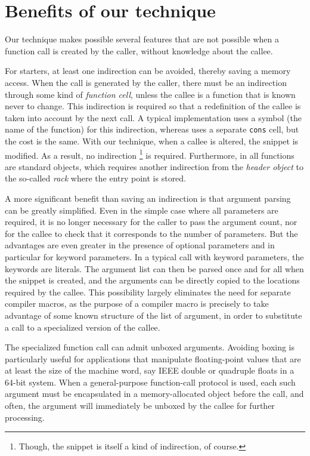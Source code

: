 \section{Benefits of our technique}
\label{sec-benefits}

Our technique makes possible several features that are not possible
when a function call is created by the caller, without knowledge
about the callee.

For starters, at least one indirection can be avoided, thereby saving
a memory access.  When the call is generated by the caller, there must
be an indirection through some kind of \emph{function cell}, unless the
callee is a function that is known never to change.  This indirection
is required so that a redefinition of the callee is taken into account
by the next call.  A typical \commonlisp{} implementation uses a
symbol (the name of the function) for this indirection, whereas
\sicl{} uses a separate \texttt{cons} cell, but the cost is the same.
With our technique, when a callee is altered, the snippet is
modified.  As a result, no indirection%
\footnote{Though, the snippet is itself a kind of indirection, of course.}
is required.  Furthermore, in
\sicl{} all functions are standard objects, which requires another
indirection from the \emph{header object} to the so-called \emph{rack}
where the entry point is stored.

A more significant benefit than saving an indirection is that argument
parsing can be greatly simplified.  Even in the simple case where all
parameters are required, it is no longer necessary for the caller to
pass the argument count, nor for the callee to check that it
corresponds to the number of parameters.  But the advantages are even
greater in the presence of optional parameters and in particular for
keyword parameters.  In a typical call with keyword parameters, the
keywords are literals.  The argument list can then be parsed once and
for all when the snippet is created, and the arguments can be directly
copied to the locations required by the callee.  This possibility
largely eliminates the need for separate compiler macros, as the
purpose of a compiler macro is precisely to take advantage of some
known structure of the list of argument, in order to substitute a call
to a specialized version of the callee.

The specialized function call can admit unboxed arguments.  Avoiding
boxing is particularly useful for applications that manipulate
floating-point values that are at least the size of the machine word,
say IEEE double or quadruple floats in a 64-bit system.  When a
general-purpose function-call protocol is used, each such argument
must be encapsulated in a memory-allocated object before the call, and
often, the argument will immediately be unboxed by the callee for
further processing.

